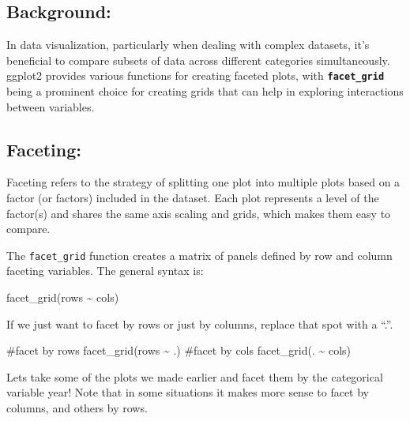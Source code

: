 \documentclass[
  letterpaper,
  DIV=11,
  numbers=noendperiod]{scrreprt}
\newenvironment{Shaded}{\begin{snugshade}}{\end{snugshade}}
\newcommand{\CommentTok}[1]{\textcolor[rgb]{0.37,0.37,0.37}{#1}}
\newcommand{\FunctionTok}[1]{\textcolor[rgb]{0.28,0.35,0.67}{#1}}
\newcommand{\NormalTok}[1]{\textcolor[rgb]{0.00,0.23,0.31}{#1}}
\newcommand{\SpecialCharTok}[1]{\textcolor[rgb]{0.37,0.37,0.37}{#1}}
\begin{document}
\subsection{Background:}\label{background}

In data visualization, particularly when dealing with complex datasets,
it's beneficial to compare subsets of data across different categories
simultaneously. ggplot2 provides various functions for creating faceted
plots, with \textbf{\texttt{facet\_grid}} being a prominent choice for
creating grids that can help in exploring interactions between
variables.

\subsection{Faceting:}\label{faceting}

Faceting refers to the strategy of splitting one plot into multiple
plots based on a factor (or factors) included in the dataset. Each plot
represents a level of the factor(s) and shares the same axis scaling and
grids, which makes them easy to compare.

The \texttt{facet\_grid} function creates a matrix of panels defined by
row and column faceting variables. The general syntax is:

\begin{Shaded}
\begin{Highlighting}[]
\FunctionTok{facet\_grid}\NormalTok{(rows }\SpecialCharTok{\textasciitilde{}}\NormalTok{ cols)}
\end{Highlighting}
\end{Shaded}

If we just want to facet by rows or just by columns, replace that spot
with a ``.''.

\begin{Shaded}
\begin{Highlighting}[]
\CommentTok{\#facet by rows}
\FunctionTok{facet\_grid}\NormalTok{(rows }\SpecialCharTok{\textasciitilde{}}\NormalTok{ .)}
\CommentTok{\#facet by cols}
\FunctionTok{facet\_grid}\NormalTok{(. }\SpecialCharTok{\textasciitilde{}}\NormalTok{ cols)}
\end{Highlighting}
\end{Shaded}

Lets take some of the plots we made earlier and facet them by the
categorical variable year! Note that in some situations it makes more
sense to facet by columns, and others by rows.
\end{document}
